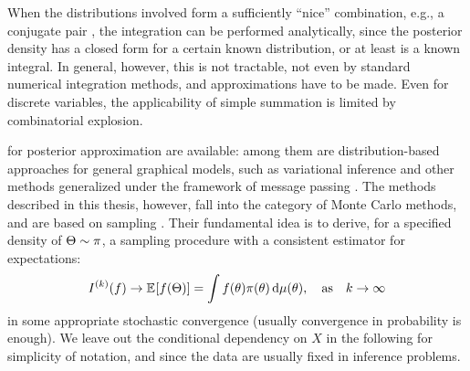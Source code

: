 When the distributions involved form a sufficiently \enquote{nice} combination, e.g., a conjugate
pair \parencites[see][chapter 2.2.2]{marin2007bayesian}[chapter
9.2.5]{murphy2012machine}, the integration can be performed analytically, since the posterior
density has a closed form for a certain known distribution, or at least is a known integral.  In
general, however, this is not tractable, not even by standard numerical integration methods, and
approximations have to be made.  Even for discrete variables, the applicability of simple summation
is limited by combinatorial explosion.

 for posterior approximation are available: among them are
distribution-based approaches for general graphical models, such as variational inference
\parencite[chapter 21 and 22]{murphy2012machine} and other methods generalized under the framework
of message passing \parencite{minka2005divergence}.  The methods described in this thesis, however,
fall into the category of Monte Carlo methods, and are based on sampling \parencites[chapter
23]{murphy2012machine}{vihola2020lectures}.  Their fundamental idea is to derive, for a specified
density of \(\Theta \sim \pi\), a sampling procedure with a consistent estimator for expectations:
\begin{equation}
  \label{eq:mc-methods}
  \kth{I}(f) \to \Exp{f(\Theta)} = \int f(\theta) \pi(\theta) \dif\mu(\theta), \quad \text{as} \quad k
  \to \infty
\end{equation}
in some appropriate stochastic convergence (usually convergence in probability is enough).  We leave
out the conditional dependency on \(X\) in the following for simplicity of notation, and since the
data are usually fixed in inference problems.

